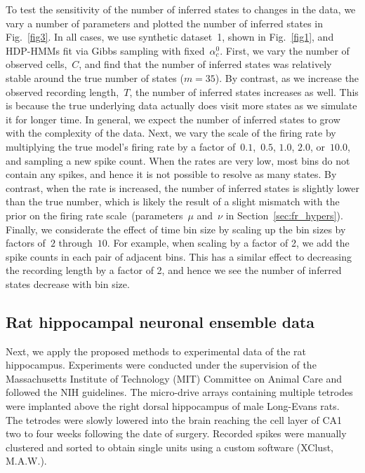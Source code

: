 To test the sensitivity of the number of inferred states to changes in
the data, we vary a number of parameters and plotted the number of
inferred states in Fig.~\ref{fig3}. In all cases, we use synthetic
dataset~1, shown in Fig.~\ref{fig1}, and HDP-HMMs fit via Gibbs
sampling with fixed~$\alpha_c^0$. First, we vary the number of
observed cells,~$C$, and find that the number of inferred states was
relatively stable around the true number of states ($m=35$). By
contrast, as we increase the observed recording length,~$T$, the
number of inferred states increases as well. This is because the true
underlying data actually does visit more states as we simulate it for
longer time. In general, we expect the number of inferred states to
grow with the complexity of the data. Next, we vary the scale of the
firing rate by multiplying the true model's firing rate by a factor
of~$0.1$,~$0.5$, $1.0$, $2.0$, or~$10.0$, and sampling a new spike
count. When the rates are very low, most bins do not contain any
spikes, and hence it is not possible to resolve as many states. By
contrast, when the rate is increased, the number of inferred states is
slightly lower than the true number, which is likely the result of a
slight mismatch with the prior on the firing rate
scale~(parameters~$\mu$ and~$\nu$ in
Section~\ref{sec:fr_hypers}). Finally, we considerate the effect of
time bin size by scaling up the bin sizes by factors of~$2$
through~$10$. For example, when scaling by a factor of 2, we add the
spike counts in each pair of adjacent bins. This has a similar effect
to decreasing the recording length by a factor of 2, and hence we see
the number of inferred states decrease with bin size.

 \subsection{Rat hippocampal neuronal ensemble data} 

Next, we apply the proposed methods to experimental data of the rat
hippocampus.  Experiments were conducted under the supervision of the
Massachusetts Institute of Technology (MIT) Committee on Animal Care
and followed the NIH guidelines.  The micro-drive arrays containing
multiple tetrodes were implanted above the right dorsal hippocampus of
male Long-Evans rats. The tetrodes were slowly lowered into the brain
reaching the cell layer of CA1 two to four weeks following the date of
surgery. Recorded spikes were manually clustered and sorted to obtain
single units using a custom software (XClust, M.A.W.).


